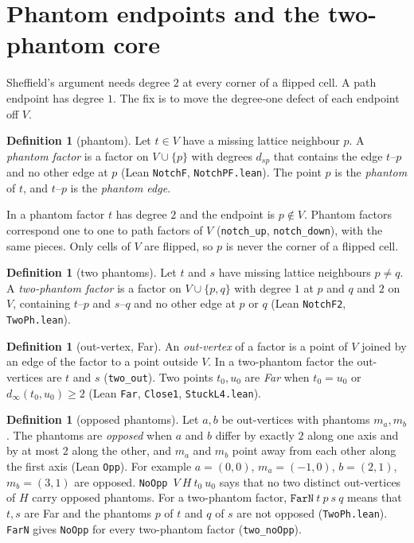 \documentclass[11pt]{article}
\theoremstyle{plain}
\theoremstyle{definition}
\newtheorem{definition}[theorem]{Definition}
\theoremstyle{remark}
\newcommand{\lean}[1]{\texttt{#1}}
\newcommand{\dist}{d_\infty}
\begin{document}
\section{Phantom endpoints and the two-phantom core}
\label{sec:phantom}

Sheffield's argument needs degree $2$ at every corner of a flipped cell.
A path endpoint has degree $1$.
The fix is to move the degree-one defect of each endpoint off $V$.

\begin{definition}[phantom]
Let $t\in V$ have a missing lattice neighbour $p$.
A \emph{phantom factor} is a factor on $V\cup\{p\}$ with degrees $d_{sp}$ that contains the edge
$t$--$p$ and no other edge at $p$ (Lean \lean{NotchF}, \lean{NotchPF.lean}).
The point $p$ is the \emph{phantom} of $t$, and $t$--$p$ is the \emph{phantom edge}.
\end{definition}

In a phantom factor $t$ has degree $2$ and the endpoint is $p\notin V$.
Phantom factors correspond one to one to path factors of $V$ (\lean{notch\_up},
\lean{notch\_down}), with the same pieces.
Only cells of $V$ are flipped, so $p$ is never the corner of a flipped cell.

\begin{definition}[two phantoms]
Let $t$ and $s$ have missing lattice neighbours $p\ne q$.
A \emph{two-phantom factor} is a factor on $V\cup\{p,q\}$ with degree $1$ at $p$ and $q$ and $2$ on
$V$, containing $t$--$p$ and $s$--$q$ and no other edge at $p$ or $q$ (Lean \lean{NotchF2},
\lean{TwoPh.lean}).
\end{definition}

\begin{definition}[out-vertex, Far]
\label{def:far}
An \emph{out-vertex} of a factor is a point of $V$ joined by an edge of the factor to a point
outside $V$.
In a two-phantom factor the out-vertices are $t$ and $s$ (\lean{two\_out}).
Two points $t_0,u_0$ are \emph{Far} when $t_0=u_0$ or $\dist(t_0,u_0)\ge2$ (Lean \lean{Far},
\lean{Close1}, \lean{StuckL4.lean}).
\end{definition}

\begin{definition}[opposed phantoms]
\label{def:opp}
Let $a,b$ be out-vertices with phantoms $m_a,m_b$.
The phantoms are \emph{opposed} when $a$ and $b$ differ by exactly $2$ along one axis and by at
most $2$ along the other, and $m_a$ and $m_b$ point away from each other along the first axis
(Lean \lean{Opp}).
For example $a=(0,0)$, $m_a=(-1,0)$, $b=(2,1)$, $m_b=(3,1)$ are opposed.
\lean{NoOpp}~$V\ H\ t_0\ u_0$ says that no two distinct out-vertices of $H$ carry opposed phantoms.
For a two-phantom factor, $\lean{FarN}\ t\ p\ s\ q$ means that $t,s$ are Far and the phantoms $p$ of
$t$ and $q$ of $s$ are not opposed (\lean{TwoPh.lean}).
\lean{FarN} gives \lean{NoOpp} for every two-phantom factor (\lean{two\_noOpp}).
\end{definition}
\end{document}
